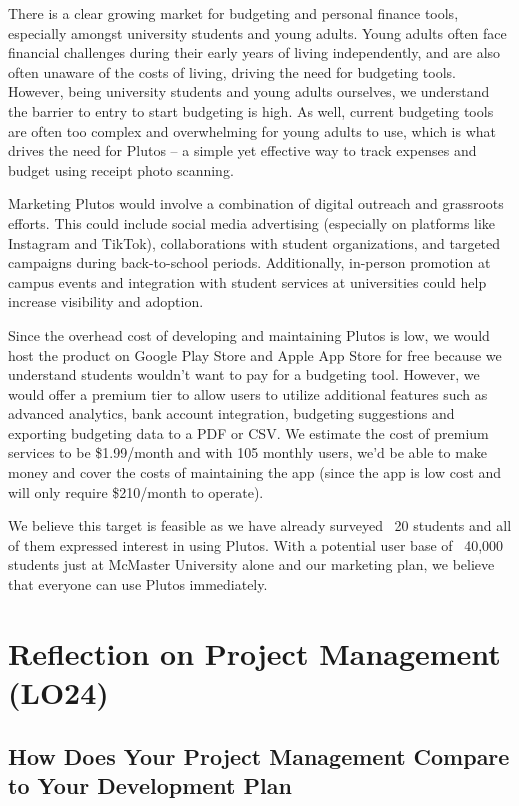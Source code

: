 \documentclass{article}
\begin{document}
There is a clear growing market for budgeting and personal finance tools, especially amongst university students and young adults.
Young adults often face financial challenges during their early years of living independently, and are also often
unaware of the costs of living, driving the need for budgeting tools. However, being university students and young adults ourselves,
we understand the barrier to entry to start budgeting is high. As well, current budgeting tools are often too complex and overwhelming for
young adults to use, which is what drives the need for Plutos -- a simple yet effective way to track expenses and budget using receipt
photo scanning.

Marketing Plutos would involve a combination of digital outreach and grassroots efforts. This could include social media advertising 
(especially on platforms like Instagram and TikTok), collaborations with student organizations, and targeted campaigns during back-to-school periods. 
Additionally, in-person promotion at campus events and integration with student services at universities could help increase visibility and adoption.

Since the overhead cost of developing and maintaining Plutos is low, we would host the product on Google Play Store and Apple App Store for free
because we understand students wouldn't want to pay for a budgeting tool. However, we would offer a premium tier to allow users to 
utilize additional features such as advanced analytics, bank account integration, budgeting suggestions and exporting budgeting data
to a PDF or CSV. We estimate the cost of premium services to be \$1.99/month and with 105 monthly users, we'd be able to make money
and cover the costs of maintaining the app (since the app is low cost and will only require \$210/month to operate).

We believe this target is feasible as we have already surveyed ~20 students and all of them expressed interest in using Plutos.
With a potential user base of ~40,000 students just at McMaster University alone and our marketing plan, we believe that everyone can 
use Plutos immediately. 

\section{Reflection on Project Management (LO24)}

\subsection{How Does Your Project Management Compare to Your Development Plan}
\end{document}

